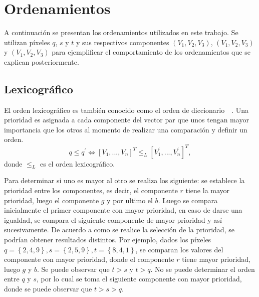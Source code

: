 \section{Ordenamientos}
\label{chap:marco}
A continuación se presentan los ordenamientos utilizados en este trabajo. Se utilizan píxeles $q$, $s$ y $t$ y sus respectivos componentes $(V_{1},V_{2},V_{3})$, $(V_{1},V_{2},V_{3})$ y $(V_{1},V_{2},V_{3})$ para ejemplificar el comportamiento de los ordenamientos que se explican posteriormente.

\subsection{Lexicográfico}
\label{chap:marco-lex}
El orden lexicográfico es también conocido como el orden de diccionario~\cite{chanussot1998total}~\cite{talbot98complete}. Una prioridad es asignada a cada componente del vector par que unos tengan mayor importancia que los otros al momento de realizar una comparación y definir un orden.
 
 
\begin{equation}
q \leq q^{\prime} \Leftrightarrow \left[  V_{1},...,V_{n} \right]^{T} \leq_{L} \left[  V^{\prime}_{1},...,V^{\prime}_{n} \right]^{T},
\end{equation}
donde $\leq_{L}$ es el orden lexicográfico.

Para determinar si uno es mayor al otro se realiza los siguiente: se establece la prioridad entre los componentes, es decir, el componente $r$ tiene la mayor prioridad, luego el componente $g$ y por ultimo el $b$. Luego se compara inicialmente el primer componente con mayor prioridad, en caso de darse una igualdad, se compara el siguiente componente de mayor prioridad y así sucesivamente. De acuerdo a como se realice la selección de la prioridad, se podrían obtener resultados distintos.
Por ejemplo, dados los píxeles $q=\left\{2,4,9\right\}, s=\left\{2,5,9\right\}, t=\left\{8,4,1\right\}$, se comparan los valores del componente con mayor prioridad, donde el componente $r$ tiene mayor prioridad, luego $g$ y $b$. Se puede observar que $t>s$ y $t>q$. No se puede determinar el orden entre $q$ y $s$, por lo cual se toma el siguiente componente con mayor prioridad, donde se puede observar que $t>s>q$.

